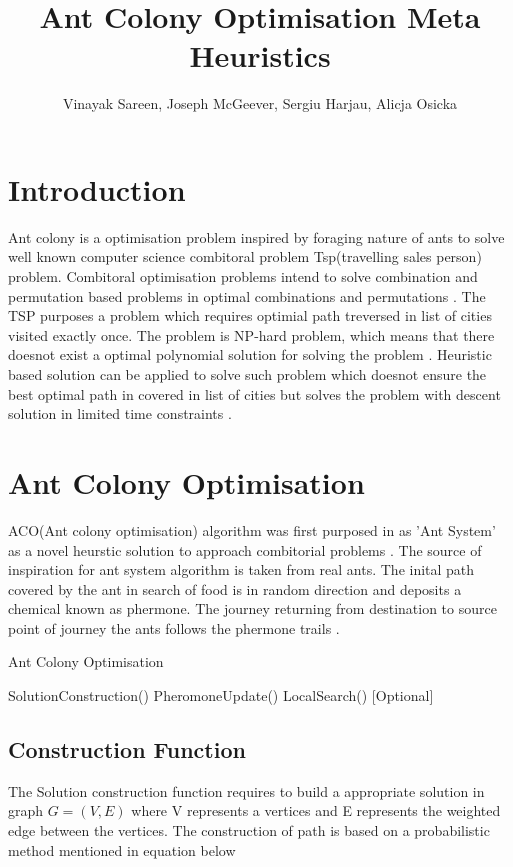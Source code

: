 \documentclass{article}
\title{Ant Colony Optimisation Meta Heuristics}
\author{ {
		Vinayak Sareen, Joseph McGeever, Sergiu Harjau, Alicja Osicka	
	}
}
\date{}
\begin{document}
	\maketitle
	\section{Introduction}
	Ant colony is a optimisation problem inspired by foraging nature of ants to solve well known computer science combitoral problem Tsp(travelling sales person) problem. Combitoral optimisation problems intend to solve combination and permutation based problems in optimal combinations and permutations \citep*{SOCHA20081155}. The TSP purposes a problem which requires optimial path treversed in list of cities visited exactly once. The problem is NP-hard problem, which means that there doesnot exist a optimal polynomial solution for solving the problem \citep*{SOCHA20081155}. Heuristic based solution can be applied to solve such problem which doesnot ensure the best optimal path in covered in list of cities but 
	solves the problem with descent solution in limited time constraints \citep*{SOCHA20081155}. 

	\section{Ant Colony Optimisation}

	ACO(Ant colony optimisation) algorithm was first purposed in as 'Ant System' as a novel heurstic solution to approach combitorial problems \citep*{782657}. The source of inspiration for ant system algorithm is taken from real ants. The inital path covered by the ant in search of food is in random direction and deposits a chemical known as phermone. The journey returning from destination to source point of journey the ants follows the phermone trails \citep*{SOCHA20081155}.  

	\begin{algorithm}
		\caption{Ant Colony Optimisation}
		\begin{algorithmic}
				\State SolutionConstruction()
				\State PheromoneUpdate()
				\State LocalSearch() [Optional]
			\EndWhile
		\end{algorithmic}
	\end{algorithm}

	\subsection*{Construction Function}	
	The Solution construction function requires to build a appropriate solution in graph $G = (V, E)$ where V represents a vertices and E represents the weighted edge between the vertices. The construction of path is based on a probabilistic method mentioned in equation below \\ 
\end{document}
